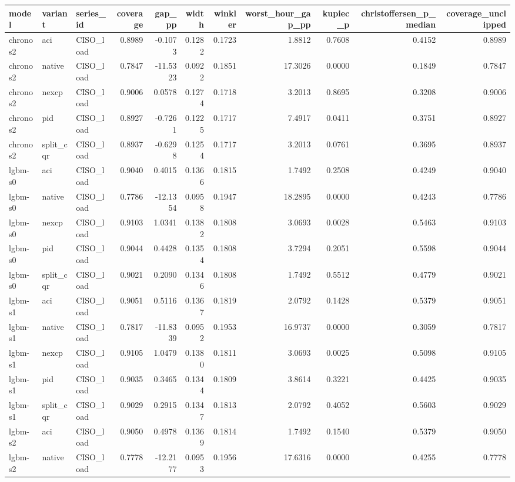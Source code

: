 \begin{tabular}{lllrrrrrrrr}
\toprule
model & variant & series_id & coverage & gap_pp & width & winkler & worst_hour_gap_pp & kupiec_p & christoffersen_p_median & coverage_unclipped \\
\midrule
chronos2 & aci & CISO_load & 0.8989 & -0.1073 & 0.1282 & 0.1723 & 1.8812 & 0.7608 & 0.4152 & 0.8989 \\
chronos2 & native & CISO_load & 0.7847 & -11.5323 & 0.0922 & 0.1851 & 17.3026 & 0.0000 & 0.1849 & 0.7847 \\
chronos2 & nexcp & CISO_load & 0.9006 & 0.0578 & 0.1274 & 0.1718 & 3.2013 & 0.8695 & 0.3208 & 0.9006 \\
chronos2 & pid & CISO_load & 0.8927 & -0.7261 & 0.1225 & 0.1717 & 7.4917 & 0.0411 & 0.3751 & 0.8927 \\
chronos2 & split_cqr & CISO_load & 0.8937 & -0.6298 & 0.1254 & 0.1717 & 3.2013 & 0.0761 & 0.3695 & 0.8937 \\
lgbm-s0 & aci & CISO_load & 0.9040 & 0.4015 & 0.1366 & 0.1815 & 1.7492 & 0.2508 & 0.4249 & 0.9040 \\
lgbm-s0 & native & CISO_load & 0.7786 & -12.1354 & 0.0958 & 0.1947 & 18.2895 & 0.0000 & 0.4243 & 0.7786 \\
lgbm-s0 & nexcp & CISO_load & 0.9103 & 1.0341 & 0.1382 & 0.1808 & 3.0693 & 0.0028 & 0.5463 & 0.9103 \\
lgbm-s0 & pid & CISO_load & 0.9044 & 0.4428 & 0.1354 & 0.1808 & 3.7294 & 0.2051 & 0.5598 & 0.9044 \\
lgbm-s0 & split_cqr & CISO_load & 0.9021 & 0.2090 & 0.1346 & 0.1808 & 1.7492 & 0.5512 & 0.4779 & 0.9021 \\
lgbm-s1 & aci & CISO_load & 0.9051 & 0.5116 & 0.1367 & 0.1819 & 2.0792 & 0.1428 & 0.5379 & 0.9051 \\
lgbm-s1 & native & CISO_load & 0.7817 & -11.8339 & 0.0952 & 0.1953 & 16.9737 & 0.0000 & 0.3059 & 0.7817 \\
lgbm-s1 & nexcp & CISO_load & 0.9105 & 1.0479 & 0.1380 & 0.1811 & 3.0693 & 0.0025 & 0.5098 & 0.9105 \\
lgbm-s1 & pid & CISO_load & 0.9035 & 0.3465 & 0.1344 & 0.1809 & 3.8614 & 0.3221 & 0.4425 & 0.9035 \\
lgbm-s1 & split_cqr & CISO_load & 0.9029 & 0.2915 & 0.1347 & 0.1813 & 2.0792 & 0.4052 & 0.5603 & 0.9029 \\
lgbm-s2 & aci & CISO_load & 0.9050 & 0.4978 & 0.1369 & 0.1814 & 1.7492 & 0.1540 & 0.5379 & 0.9050 \\
lgbm-s2 & native & CISO_load & 0.7778 & -12.2177 & 0.0953 & 0.1956 & 17.6316 & 0.0000 & 0.4255 & 0.7778 \\

\end{tabular}
